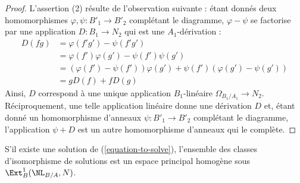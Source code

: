 \begin{proof}
\medskip\noindent
L'assertion (2) résulte de l'observation suivante : étant donnés deux homomorphismes
$\varphi, \psi : B'_1 \to B'_2$ complétant le diagramme,
$\varphi - \psi$ se factorise par une application $D : B_1 \to N_2$ qui
est une $A_1$-dérivation :
\begin{align*}
D(fg) & = \varphi(f'g') - \psi(f'g') \\
& =
\varphi(f')\varphi(g') - \psi(f')\psi(g') \\
& =
(\varphi(f') - \psi(f'))\varphi(g') + \psi(f')(\varphi(g') - \psi(g')) \\
& =
gD(f) + fD(g)
\end{align*}
Ainsi, $D$ correspond à une unique application $B_1$-linéaire
$\Omega_{B_1/A_1} \to N_2$. Réciproquement, une telle application linéaire
donne une dérivation $D$ et, étant donné un homomorphisme d'anneaux $\psi : B'_1 \to B'_2$
complétant le diagramme,
l'application $\psi + D$ est un autre homomorphisme d'anneaux qui le complète.
\end{proof}

\begin{lemma}
\label{lemma-choices}
S'il existe une solution de (\ref{equation-to-solve}), l'ensemble des
classes d'isomorphisme de solutions est un espace principal homogène sous
$\Ext^1_B(\NL_{B/A}, N)$.
\end{lemma}

